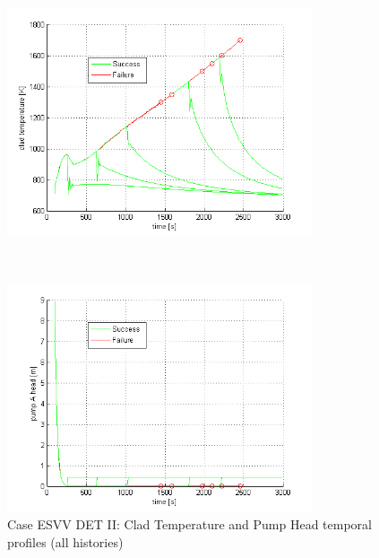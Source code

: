 \documentclass{mc2013}
\begin{document}
\begin{figure}
 \begin{minipage}[b]{8.5cm}
  \centering
   \includegraphics[width=9cm]{figures/DETvarClad.png}
 \end{minipage}
 \ \hspace{2mm} \hspace{3mm} \
 \begin{minipage}[b]{8.5cm}
  \centering
   \includegraphics[width=9cm]{figures/DETvarHead.png}
 \end{minipage}
\caption{Case ESVV DET II: Clad Temperature and Pump Head temporal profiles (all histories)}
\label{fig:ESVVall}
\end{figure}
\end{document}
